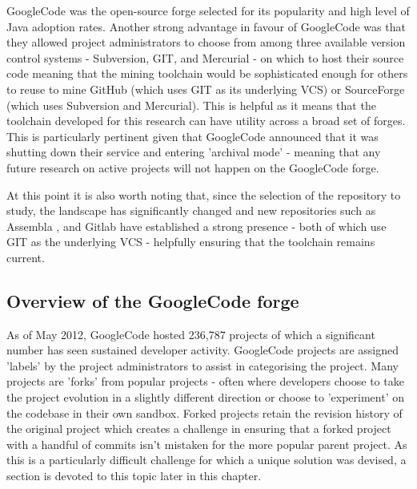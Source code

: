 GoogleCode was the open-source forge selected for its popularity and high level of Java adoption rates. Another strong advantage in favour of GoogleCode was that they allowed project administrators to choose from among three available version control systems - Subversion, GIT, and Mercurial - on which to host their source code meaning that the mining toolchain would be sophisticated enough for others to reuse to mine GitHub (which uses GIT as its underlying VCS) or SourceForge (which uses Subversion and Mercurial). This is helpful as it means that the toolchain developed for this research can have utility across a broad set of forges. This is particularly pertinent given that GoogleCode announced that it was shutting down their service and entering 'archival mode' - meaning that any future research on active projects will not happen on the GoogleCode forge. 

At this point it is also worth noting that, since the selection of the repository to study, the landscape has significantly changed and new repositories such as Assembla \citep{assembla}, and Gitlab \citep{gitlab} have established a strong presence - both of which use GIT as the underlying VCS - helpfully ensuring that the toolchain remains current.

\subsection{Overview of the GoogleCode forge}
As of May 2012, GoogleCode hosted 236,787 projects of which a significant number has seen sustained developer activity. GoogleCode projects are assigned 'labels' by the project administrators to assist in categorising the project. Many projects are 'forks' from popular projects - often where developers choose to take the project evolution in a slightly different direction or choose to 'experiment' on the codebase in their own sandbox. Forked projects retain the revision history of the original project which creates a challenge in ensuring that a forked project with a handful of commits isn't mistaken for the more popular parent project. As this is a particularly difficult challenge for which a unique solution was devised, a section is devoted to this topic later in this chapter.

